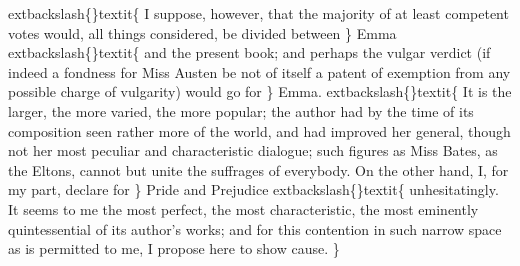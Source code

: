 \documentclass[10pt]{book}
\begin{document}
	extbackslash\{\}textit\{
    I suppose, however, that the majority of at least competent votes
would, all things considered, be divided between
   \}
   Emma
   	extbackslash\{\}textit\{
    and the present
book; and perhaps the vulgar verdict (if indeed a fondness for Miss
Austen be not of itself a patent of exemption from any possible charge
of vulgarity) would go for
   \}
   Emma.
   	extbackslash\{\}textit\{
    It is the larger, the more varied, the
more popular; the author had by the time of its composition seen rather
more of the world, and had improved her general, though not her most
peculiar and characteristic dialogue; such figures as Miss Bates, as the
Eltons, cannot but unite the suffrages of everybody. On the other hand,
I, for my part, declare for
   \}
   Pride and Prejudice
   	extbackslash\{\}textit\{
    unhesitatingly. It
seems to me the most perfect, the most characteristic, the most
eminently quintessential of its author’s works; and for this contention
in such narrow space as is permitted to me, I propose here to show
cause.
   \}
\end{document}
